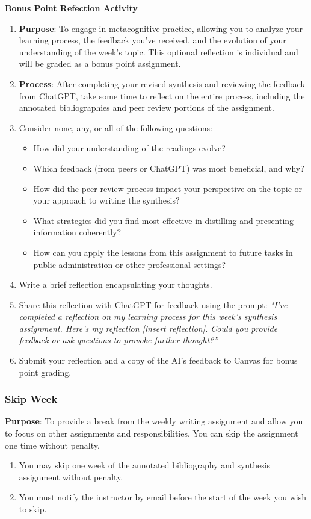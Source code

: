 \documentclass[12pt, letterpaper]{article}
\begin{document}
\textbf{Bonus Point Refection Activity}
    \begin{enumerate}
        \item \textbf{Purpose}: To engage in metacognitive practice, allowing you to analyze your learning process, the feedback you've received, and the evolution of your understanding of the week's topic. This optional reflection is individual and will be graded as a bonus point assignment.
        \item \textbf{Process}: After completing your revised synthesis and reviewing the feedback from ChatGPT, take some time to reflect on the entire process, including the annotated bibliographies and peer review portions of the assignment. 
        \item Consider none, any, or all of the following questions:
        \begin{itemize}
            \item How did your understanding of the readings evolve?
            \item Which feedback (from peers or ChatGPT) was most beneficial, and why?
            \item How did the peer review process impact your perspective on the topic or your approach to writing the synthesis?
            \item What strategies did you find most effective in distilling and presenting information coherently?
            \item How can you apply the lessons from this assignment to future tasks in public administration or other professional settings?
        \end{itemize}
        \item Write a brief reflection encapsulating your thoughts.
        \item Share this reflection with ChatGPT for feedback using the prompt: \textit{"I've completed a reflection on my learning process for this week's synthesis assignment. Here's my reflection [insert reflection]. Could you provide feedback or ask questions to provoke further thought?”}
        \item Submit your reflection and a copy of the AI's feedback to Canvas for bonus point grading.
    \end{enumerate}


\subsubsection*{Skip Week}
\textbf{Purpose}: To provide a break from the weekly writing assignment and allow you to focus on other assignments and responsibilities. You can skip the assignment one time without penalty.
    \begin{enumerate}
        \item You may skip one week of the annotated bibliography and synthesis assignment without penalty.
        \item You must notify the instructor by email before the start of the week you wish to skip.
    \end{enumerate}
\end{document}
